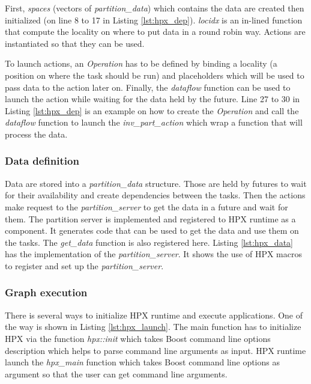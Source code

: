 First, \textit{spaces} (vectors of \textit{partition\_data}) which contains the data are created then initialized (on line 8 to 17 in Listing \ref{lst:hpx_dep}).
\textit{locidx} is an in-lined function that compute the locality on where to put data in a round robin way.
Actions are instantiated so that they can be used.

To launch actions, an \textit{Operation} has to be defined by binding a locality (a position on where the task should be run) and placeholders which will be used to pass data to the action later on.
Finally, the \textit{dataflow} function can be used to launch the action while waiting for the data held by the future.
Line 27 to 30 in Listing \ref{lst:hpx_dep} is an example on how to create the \textit{Operation} and call the \textit{dataflow} function to launch the \textit{inv\_part\_action} which wrap a function that will process the data.

\begin{figure}

\end{figure}

\subsubsection{Data definition}
Data are stored into a \textit{partition\_data} structure.
Those are held by futures to wait for their availability and create dependencies between the tasks.
Then the actions make request to the \textit{partition\_server} to get the data in a future and wait for them.
The partition server is implemented and registered to HPX runtime as a component.
It generates code that can be used to get the data and use them on the tasks.
The \textit{get\_data} function is also registered here.
Listing \ref{lst:hpx_data} has the implementation of the \textit{partition\_server}.
It shows the use of HPX macros to register and set up the \textit{partition\_server}.


\begin{figure}

\end{figure}

\subsubsection{Graph execution}
There is several ways to initialize HPX runtime and execute applications.
One of the way is shown in Listing \ref{lst:hpx_launch}.
The main function has to initialize HPX via the function \textit{hpx::init} which takes Boost command line options description which helps to parse command line arguments as input.
HPX runtime launch the \textit{hpx\_main} function which takes Boost command line options as argument so that the user can get command line arguments.

